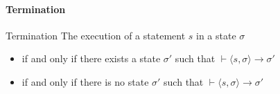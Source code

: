 \newpage
\paragraph{Termination}
\begin{definition}[]{Termination}
    The execution of a statement $s$ in a state $\sigma$
    \begin{itemize}
        \item {} if and only if there exists a state $\sigma'$ such that $\vdash \langle s, \sigma \rangle \rightarrow \sigma'$
        \item {} if and only if there is no state $\sigma'$ such that $\vdash \langle s, \sigma \rangle \rightarrow \sigma'$
    \end{itemize}
\end{definition}
